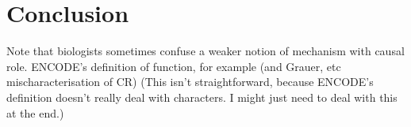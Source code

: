 \documentclass{article}
\begin{document}






\section{Conclusion}
\label{sec:conclusion}

Note that biologists sometimes confuse a weaker notion of mechanism with causal role.
ENCODE's definition of function, for example (and Grauer, etc mischaracterisation of CR)
(This isn't straightforward, because ENCODE's definition doesn't really deal with characters. I might just need to deal with this at the end.)
\end{document}
